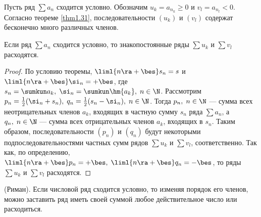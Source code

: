 \documentclass[a4paper]{article}
\begin{document}
Пусть ряд $\sum a_n$ сходится условно. Обозначим $u_k = a_{n_k}
\ge0$ и $v_l = a_{n_l} < 0$. Согласно теореме \ref{thm1.31},
последовательности $(u_k)$ и $(v_l)$ содержат бесконечно много
различных членов.

\begin{theorem}\label{thm1.32}
Если ряд $\sum a_n$ сходится условно, то знакопостоянные ряды $\sum
u_k$ и $\sum v_l$ расходятся.
\end{theorem}

\begin{proof}
По условию теоремы, $\liml{n\ra+\bes} s_n = s$ и $\liml{n\ra+\bes}
\si_n = +\bes$, где $s_n = \sumkun a_k, \; \si_n = \sumkun \hm{a_k},
\; n\in\N$. Рассмотрим $p_n = \frac12 (\si_n + s_n), \; q_n =
\frac12 (s_n - \si_n), \; n\in\N$. Тогда $p_n, \; n\in\N$ --- сумма
всех неотрицательных членов $a_k$, входящих в частную сумму $s_n$
ряда $\sum a_n$, а $q_n, \; n\in\N$ --- сумма всех отрицательных
членов $a_k$, входящих в $s_n$. Таким образом, последовательности
$(p_n)$ и $(q_n)$ будут некоторыми подпоследовательностями частных
сумм рядов $\sum u_k$ и $\sum v_l$, соответственно. Так как, по
определению, $\liml{n\ra+\bes} p_n = +\bes, \; \liml{n\ra+\bes} q_n
= -\bes$, то ряды $\sum u_k$ и $\sum v_l$ расходятся.
\end{proof}

\begin{theorem}
(Риман). Если числовой ряд сходится условно, то изменяя порядок его
членов, можно заставить ряд иметь своей суммой любое действительное
число или расходиться.
\end{theorem}
\end{document}
